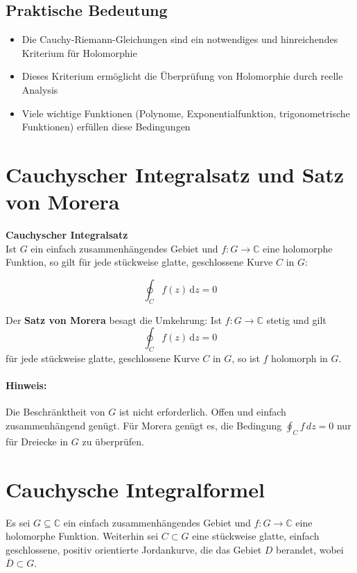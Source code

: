 \documentclass[a4paper,11pt,oneside,open=any,parskip=half, DIV=15]{scrreprt}
\begin{document}
   \subsection*{Praktische Bedeutung}
      \begin{itemize}
         \item Die Cauchy-Riemann-Gleichungen sind ein notwendiges und hinreichendes Kriterium für Holomorphie
         \item Dieses Kriterium ermöglicht die Überprüfung von Holomorphie durch reelle Analysis
         \item Viele wichtige Funktionen (Polynome, Exponentialfunktion, trigonometrische Funktionen) erfüllen diese Bedingungen
      \end{itemize}

\section{Cauchyscher Integralsatz und Satz von Morera}

   \textbf{Cauchyscher Integralsatz}\\
   Ist \( G \) ein einfach zusammenhängendes Gebiet und \( f \colon G \to \mathbb{C} \) eine holomorphe Funktion, so gilt für jede stückweise glatte, geschlossene Kurve \( C \) in \( G \):
   \begin{importantbox}
      \[
         \oint_C f(z) \, \mathrm{d}z = 0
      \]
   \end{importantbox}

   Der \textbf{Satz von Morera} besagt die Umkehrung: Ist \( f \colon G \to \mathbb{C} \) stetig und gilt
   \[
      \oint_C f(z) \, \mathrm{d}z = 0
   \]
   für jede stückweise glatte, geschlossene Kurve \( C \) in \( G \), so ist \( f \) holomorph in \( G \).

   \paragraph{Hinweis:}
   Die Beschränktheit von \(G\) ist nicht erforderlich. Offen und einfach zusammenhängend genügt.
   Für Morera genügt es, die Bedingung \(\oint_C f\,dz=0\) nur für Dreiecke in \(G\) zu überprüfen.

\section{Cauchysche Integralformel}

   Es sei \( G \subseteq \mathbb{C} \) ein einfach zusammenhängendes Gebiet und 
   \( f \colon G \to \mathbb{C} \) eine holomorphe Funktion. 
   Weiterhin sei \( C \subset G \) eine stückweise glatte, einfach geschlossene, 
   positiv orientierte Jordankurve, die das Gebiet \( D \) berandet, wobei \(\overline{D} \subset G\).
\end{document}
